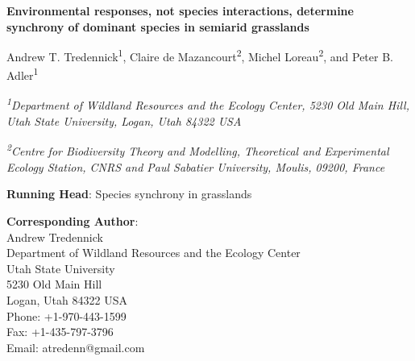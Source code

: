 \documentclass[12pt,]{article}
\title{}
\author{}
\date{}
\begin{document}
\maketitle






\begin{singlespace}

\begin{center}
\large{\textbf{Environmental responses, not species interactions, determine synchrony of dominant species in semiarid grasslands}}

\renewcommand*{\thefootnote}{\fnsymbol{footnote}}

\vspace{1em}

\normalsize{Andrew T. Tredennick\textsuperscript{1}, Claire de Mazancourt\textsuperscript{2}, Michel Loreau\textsuperscript{2}, and Peter B. Adler\textsuperscript{1}}

\vspace{1em}

\textit{\small{\textsuperscript{1}Department of Wildland Resources and the Ecology Center, 5230 Old Main Hill, Utah State University, Logan, Utah 84322 USA}}

\textit{\small{\textsuperscript{2}Centre for Biodiversity Theory and Modelling, Theoretical and Experimental Ecology Station, CNRS and Paul Sabatier University, Moulis, 09200, France}}

\end{center}

\vspace{2em}

\textbf{Running Head}: Species synchrony in grasslands

\textbf{Corresponding Author}: \\
\hspace{2em}Andrew Tredennick \\  
\hspace{2em}Department of Wildland Resources and the Ecology Center\\
\hspace{2em}Utah State University \\
\hspace{2em}5230 Old Main Hill \\
\hspace{2em}Logan, Utah 84322 USA \\
\hspace{2em}Phone: +1-970-443-1599 \\
\hspace{2em}Fax: +1-435-797-3796 \\
\hspace{2em}Email: atredenn@gmail.com

\end{singlespace}\renewcommand*{\thefootnote}{\arabic{footnote}}
\end{document}
